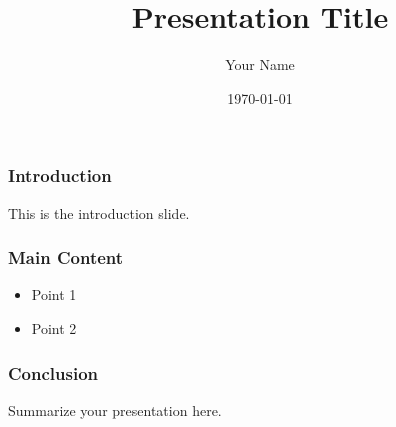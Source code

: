 \documentclass{beamer}
\title{Presentation Title}
\author{Your Name}
\date{\today}
\begin{document}
\frame{\titlepage}

\begin{frame}
\frametitle{Introduction}
This is the introduction slide.
\end{frame}

\begin{frame}
\frametitle{Main Content}
\begin{itemize}
    \item Point 1
    \item Point 2
\end{itemize}
\end{frame}

\begin{frame}
\frametitle{Conclusion}
Summarize your presentation here.
\end{frame}
\end{document}
